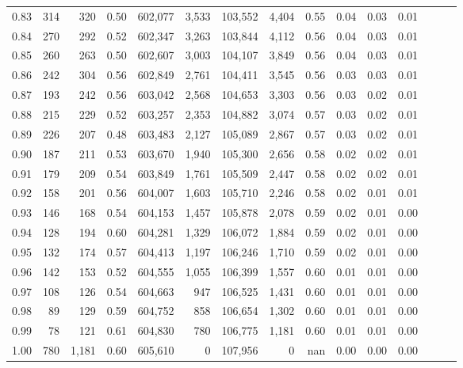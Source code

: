 \begin{tabular}{rrrrrrrrrrrrrrr}
0.83 &     314 &    320 &  0.50 &  602,077 &    3,533 &  103,552 &    4,404 &  0.55 &  0.04 &  0.03 &      0.01 \\
0.84 &     270 &    292 &  0.52 &  602,347 &    3,263 &  103,844 &    4,112 &  0.56 &  0.04 &  0.03 &      0.01 \\
0.85 &     260 &    263 &  0.50 &  602,607 &    3,003 &  104,107 &    3,849 &  0.56 &  0.04 &  0.03 &      0.01 \\
0.86 &     242 &    304 &  0.56 &  602,849 &    2,761 &  104,411 &    3,545 &  0.56 &  0.03 &  0.03 &      0.01 \\
0.87 &     193 &    242 &  0.56 &  603,042 &    2,568 &  104,653 &    3,303 &  0.56 &  0.03 &  0.02 &      0.01 \\
0.88 &     215 &    229 &  0.52 &  603,257 &    2,353 &  104,882 &    3,074 &  0.57 &  0.03 &  0.02 &      0.01 \\
0.89 &     226 &    207 &  0.48 &  603,483 &    2,127 &  105,089 &    2,867 &  0.57 &  0.03 &  0.02 &      0.01 \\
0.90 &     187 &    211 &  0.53 &  603,670 &    1,940 &  105,300 &    2,656 &  0.58 &  0.02 &  0.02 &      0.01 \\
0.91 &     179 &    209 &  0.54 &  603,849 &    1,761 &  105,509 &    2,447 &  0.58 &  0.02 &  0.02 &      0.01 \\
0.92 &     158 &    201 &  0.56 &  604,007 &    1,603 &  105,710 &    2,246 &  0.58 &  0.02 &  0.01 &      0.01 \\
0.93 &     146 &    168 &  0.54 &  604,153 &    1,457 &  105,878 &    2,078 &  0.59 &  0.02 &  0.01 &      0.00 \\
0.94 &     128 &    194 &  0.60 &  604,281 &    1,329 &  106,072 &    1,884 &  0.59 &  0.02 &  0.01 &      0.00 \\
0.95 &     132 &    174 &  0.57 &  604,413 &    1,197 &  106,246 &    1,710 &  0.59 &  0.02 &  0.01 &      0.00 \\
0.96 &     142 &    153 &  0.52 &  604,555 &    1,055 &  106,399 &    1,557 &  0.60 &  0.01 &  0.01 &      0.00 \\
0.97 &     108 &    126 &  0.54 &  604,663 &      947 &  106,525 &    1,431 &  0.60 &  0.01 &  0.01 &      0.00 \\
0.98 &      89 &    129 &  0.59 &  604,752 &      858 &  106,654 &    1,302 &  0.60 &  0.01 &  0.01 &      0.00 \\
0.99 &      78 &    121 &  0.61 &  604,830 &      780 &  106,775 &    1,181 &  0.60 &  0.01 &  0.01 &      0.00 \\
1.00 &     780 &  1,181 &  0.60 &  605,610 &        0 &  107,956 &        0 &   nan &  0.00 &  0.00 &      0.00 \\
\bottomrule
\end{tabular}
